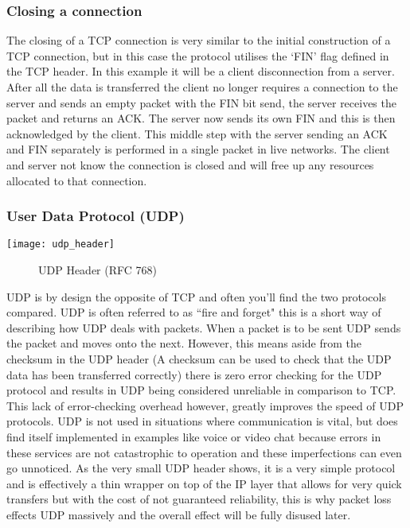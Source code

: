 \subsubsection*{Closing a connection}
The closing of a TCP connection is very similar to the initial construction of a TCP connection, but in this case the protocol utilises the `FIN' flag defined in the TCP header. In this example it will be a client disconnection from a server. After all the data is transferred the client no longer requires a connection to the server and sends an empty packet with the FIN bit send, the server receives the packet and returns an ACK. The server now sends its own FIN and this is then acknowledged by the client. This middle step with the server sending an ACK and FIN separately is performed in a single packet in live networks. The client and server not know the connection is closed and will free up any resources allocated to that connection.


\subsubsection{User Data Protocol (UDP)}
\begin{center}
	\texttt{[image: udp\_header]}
	\begin{figure}[h]
		\caption{UDP Header (RFC 768)}
	\end{figure}		
\end{center}

UDP is by design the opposite of TCP and often you'll find the two protocols compared. UDP is often referred to as ``fire and forget" \citep{kempf2011thoughts} this is a short way of describing how UDP deals with packets. When a packet is to be sent UDP sends the packet and moves onto the next. However, this means aside from the checksum in the UDP header (A checksum can be used to check that the UDP data has been transferred correctly) there is zero error checking for the UDP protocol and results in UDP being considered unreliable in comparison to TCP. This lack of error-checking overhead however, greatly improves the speed of UDP protocols. UDP is not used in situations where communication is vital, but does find itself implemented in examples like voice or video chat because errors in these services are not catastrophic to operation and these imperfections can even go unnoticed. 
As the very small UDP header shows, it is a very simple protocol and is effectively a thin wrapper on top of the IP layer that allows for very quick transfers but with the cost of not guaranteed reliability, this is why packet loss effects UDP massively and the overall effect will be fully disused later.

